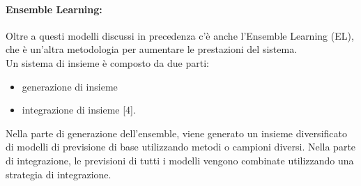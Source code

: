 \documentclass[12pt,a4paper]{report}
\begin{document}
\paragraph*{Ensemble Learning:}
Oltre a questi modelli discussi in precedenza c'è anche l'Ensemble Learning (EL), che è un'altra metodologia per aumentare le prestazioni del sistema.\\
Un sistema di insieme è composto da due parti:
\begin{itemize}
    \item generazione di insieme
    \item integrazione di insieme [4].
\end{itemize}
Nella parte di generazione dell'ensemble, viene generato un insieme diversificato di modelli di previsione di base utilizzando metodi o campioni diversi. Nella parte di integrazione, le previsioni di tutti i modelli vengono combinate utilizzando una strategia di integrazione.\\
\end{document}
